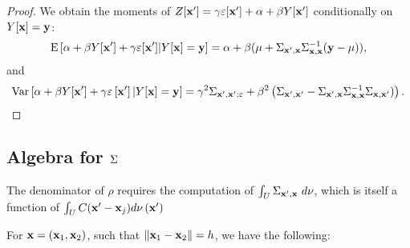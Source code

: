 \begin{proof}
We obtain the moments of $Z[\mathbf{x}']=\gamma
\varepsilon[\mathbf{x}']+\alpha+\beta
Y[\mathbf{x}']$ conditionally on $Y[\mathbf{x}]=\mathbf{y}$:
$$\mathrm{E}\left[\alpha+\beta
Y[\mathbf{x}']+\gamma
\varepsilon[\mathbf{x}']|
Y[\mathbf{x}]=\mathbf{y}\right]
=\alpha+\beta(\mu+\Sigma_{\mathbf{x}',\mathbf{x}}\Sigma_{\mathbf{x},\mathbf{x}}^{-1} (\mathbf{y}-\mu)),$$
and 
$$\mathrm{Var}\left[\alpha+\beta
Y[\mathbf{x}']+\gamma
\varepsilon\left[\mathbf{x}'\right]|
Y[\mathbf{x}]=\mathbf{y}\right]
=\gamma^2\Sigma_{\mathbf{x}',\mathbf{x}';\varepsilon}+\beta^2\left(\Sigma_{\mathbf{x}',\mathbf{x}'}-\Sigma_{\mathbf{x}',\mathbf{x}}\Sigma_{\mathbf{x},\mathbf{x}}^{-1}\Sigma_{\mathbf{x},\mathbf{x}'})\right).$$
\end{proof}




\subsection{Algebra for $\Sigma$}

The denominator of $\rho$ requires the computation of $\int_{U}\Sigma_{\mathbf{x}',\mathbf{x}}~d\nu$, which is itself a function of
$\int_{U}C(\mathbf{x}'-\mathbf{x}_j)d\nu\left(\mathbf{x}'\right)$


For $\mathbf{x}=(\mathbf{x}_1,\mathbf{x}_2)$, such that $\|\mathbf{x}_1-\mathbf{x}_2\|=h$, we have the following:

